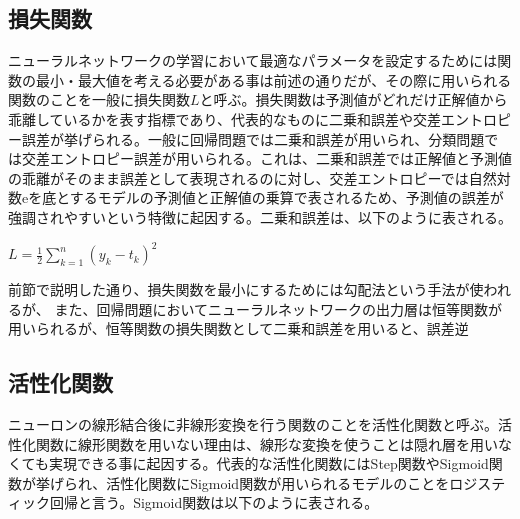 \documentclass{article}
\begin{document}



\subsection{損失関数}

ニューラルネットワークの学習において最適なパラメータを設定するためには関数の最小・最大値を考える必要がある事は前述の通りだが、その際に用いられる関数のことを一般に損失関数\begin{math}L\end{math}と呼ぶ。損失関数は予測値がどれだけ正解値から乖離しているかを表す指標であり、代表的なものに二乗和誤差や交差エントロピー誤差が挙げられる。一般に回帰問題では二乗和誤差が用いられ、分類問題では交差エントロピー誤差が用いられる。これは、二乗和誤差では正解値と予測値の乖離がそのまま誤差として表現されるのに対し、交差エントロピーでは自然対数eを底とするモデルの予測値と正解値の乗算で表されるため、予測値の誤差が強調されやすいという特徴に起因する。二乗和誤差は、以下のように表される。


\begin{center}
\begin{math}
L = \frac{1}{2} \sum_{k=1}^{n} (y_k - t_k)^{2}
\end{math}
\end{center}

前節で説明した通り、損失関数を最小にするためには勾配法という手法が使われるが、
また、回帰問題においてニューラルネットワークの出力層は恒等関数が用いられるが、恒等関数の損失関数として二乗和誤差を用いると、誤差逆



\subsection{活性化関数}

ニューロンの線形結合後に非線形変換を行う関数のことを活性化関数と呼ぶ。活性化関数に線形関数を用いない理由は、線形な変換を使うことは隠れ層を用いなくても実現できる事に起因する。代表的な活性化関数にはStep関数やSigmoid関数が挙げられ、活性化関数にSigmoid関数が用いられるモデルのことをロジスティック回帰と言う。Sigmoid関数は以下のように表される。
\end{document}
